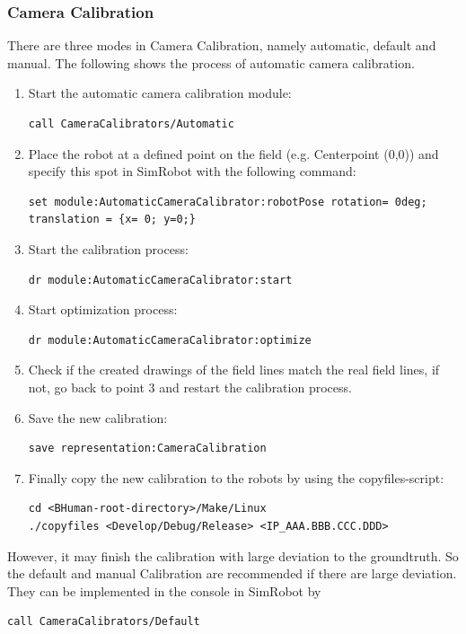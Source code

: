 \documentclass[a4paper]{article}
\begin{document}
\subsubsection{Camera Calibration}
There are three modes in Camera Calibration, namely automatic, default and manual. The following shows the process of automatic camera calibration.
\begin{enumerate}
\item Start the automatic camera calibration module:
\begin{lstlisting}
call CameraCalibrators/Automatic
\end{lstlisting}
\item Place the robot at a defined point on the field (e.g. Centerpoint (0,0)) and specify this spot in SimRobot with the following command: 
\begin{lstlisting}
set module:AutomaticCameraCalibrator:robotPose rotation= 0deg; translation = {x= 0; y=0;}
\end{lstlisting}
\item Start the calibration process:
\begin{lstlisting}
dr module:AutomaticCameraCalibrator:start
\end{lstlisting}
\item Start optimization process:
\begin{lstlisting}
dr module:AutomaticCameraCalibrator:optimize
\end{lstlisting}
\item Check if the created drawings of the field lines match the real field lines, if not, go back to point 3 and restart the calibration process.
\item Save the new calibration:
\begin{lstlisting}
save representation:CameraCalibration
\end{lstlisting}
\item Finally copy the new calibration to the robots by using the copyfiles-script:
\begin{lstlisting}
cd <BHuman-root-directory>/Make/Linux
./copyfiles <Develop/Debug/Release> <IP_AAA.BBB.CCC.DDD>
\end{lstlisting}
\end{enumerate}
However, it may finish the calibration with large deviation to the groundtruth. So the default and manual Calibration are recommended if there are large deviation. They can be implemented in the console in SimRobot by
\begin{lstlisting}
call CameraCalibrators/Default
\end{lstlisting}
\end{document}
